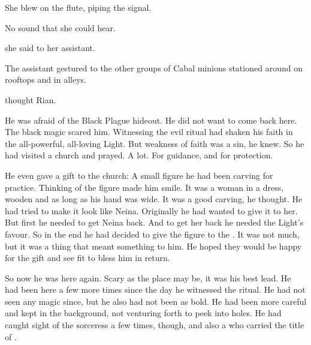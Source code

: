 She blew on the flute, piping the  signal. 

No sound that she could hear.

 she said to her assistant. 

The assistant gestured to the other groups of Cabal minions stationed around on rooftops and in alleys. 


\begin{comment}
\subsection{Rian sees raid begin}
\end{comment}
\new
 thought Rian. 

He was afraid of the Black Plague hideout. 
He did not want to come back here. 
The black magic scared him. 
Witnessing the evil ritual had shaken his faith in the all-powerful, all-loving Light. 
But weakness of faith was a sin, he knew. 
So he had visited a church and prayed. 
A lot. 
For guidance, and for protection. 

He even gave a gift to the church: 
A small figure he had been carving for practice. 
Thinking of the figure made him smile. 
It was a woman in a dress, wooden and as long as his hand was wide. 
It was a good carving, he thought. 
He had tried to make it look like Neina. 
Originally he had wanted to give it to her. 
But first he needed to get Neina back. 
And to get her back he needed the Light's favour. 
So in the end he had decided to give the figure to the \sephiroth. 
It was not much, but it was a thing that meant something to him. 
He hoped they would be happy for the gift and see fit to bless him in return. 

So now he was here again. 
Scary as the place may be, it was his best lead. 
He had been here a few more times since the day he witnessed the ritual.
He had not seen any magic since, but he also had not been as bold. 
He had been more careful and kept in the background, not venturing forth to peek into holes. 
He had caught sight of the sorceress a few times, though, and also a \dax{} who carried the title of .

